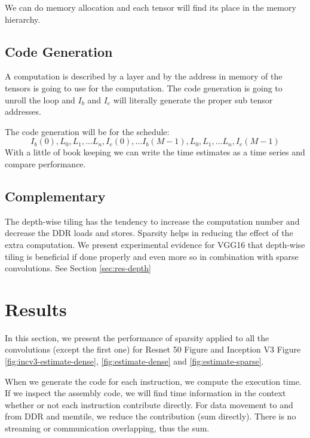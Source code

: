 \documentclass[conference]{IEEEtran}
\begin{document}
We can do memory allocation and each tensor will find its place in the
memory hierarchy.

\subsection{Code Generation}
A computation is described by a layer and by the address in memory of
the tensors is going to use for the computation. The code generation
is going to unroll the loop and $I_b$ and $I_e$ will literally
generate the proper sub tensor addresses.

The code generation will be for the schedule:
\[ I_b(0), L_0, L_1, ... L_n, I_e(0), \dots I_b(M-1), L_0, L_1, ... L_n, I_e(M-1) \]
With a little of book keeping we can write the time estimates as a
time series and compare performance.

\subsection{Complementary}
The depth-wise tiling has the tendency to increase the computation
number and decrease the DDR loads and stores. Sparsity helps in
reducing the effect of the extra computation. We present experimental
evidence for VGG16 that depth-wise tiling is beneficial if done
properly and even more so in combination with sparse convolutions. See Section \ref{sec:res-depth}



\section{Results}
\label{sec:experiments}
In this section, we present the performance of sparsity applied to all
the convolutions (except the first one) for Resnet 50 Figure and
Inception V3 Figure \ref{fig:incv3-estimate-dense},
\ref{fig:estimate-dense} and \ref{fig:estimate-sparse}.


When we generate the code for each instruction, we compute the
execution time. If we inspect the assembly code, we will find time
information in the context whether or not each instruction contribute
directly. For data movement to and from DDR and memtile, we reduce the
contribution (sum directly). There is no streaming or communication
overlapping, thus the sum.
\end{document}
